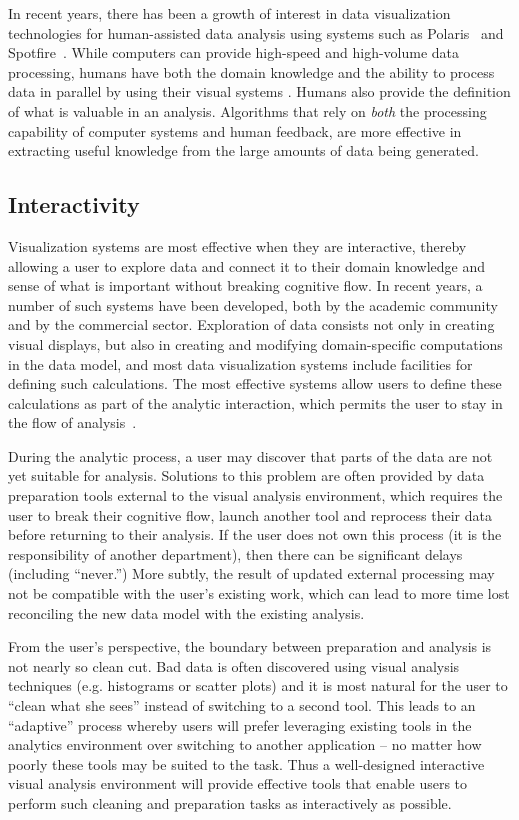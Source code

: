 In recent years, there has been a growth of interest in data visualization technologies for human-assisted data analysis using systems such as Polaris~\cite{Stolte:2008} and Spotfire~\cite{Ahlberg:1996}. While computers can provide high-speed and high-volume data processing, humans have both the domain knowledge and the ability to process data in parallel by using their visual systems \cite{Cleveland.McGill1984,Mackinlay:1986}. Humans also provide the definition of what is valuable in an analysis. Algorithms that rely on \emph{both} the processing capability of computer systems and human feedback, are more effective in extracting useful knowledge from the large amounts of data being generated.

\subsection{Interactivity}
Visualization systems are most effective when they are interactive, thereby allowing a user to explore data and connect it to their domain knowledge and sense of what is important without breaking cognitive flow. In recent years, a number of such systems have been developed, both by the academic community and by the commercial sector. Exploration of data consists not only in creating visual displays, but also in creating and modifying domain-specific computations in the data model, and most data visualization systems include facilities for defining such calculations. The most effective systems allow users to define these calculations as part of the analytic interaction, which permits the user to stay in the flow of analysis~\cite{Morton:2012}.

During the analytic process, a user may discover that parts of the data are not yet suitable for analysis. Solutions to this problem are often provided by data preparation tools external to the visual analysis environment, which requires the user to break their cognitive flow, launch another tool and reprocess their data before returning to their analysis. If the user does not own this process (\eg it is the responsibility of another department), then there can be significant delays (including ``never.'') More subtly, the result of updated external processing may not be compatible with the user's existing work, which can lead to more time lost reconciling the new data model with the existing analysis.

From the user's perspective, the boundary between preparation and analysis is not nearly so clean cut. Bad data is often discovered using visual analysis techniques (e.g. histograms or scatter plots) and it is most natural for the user to ``clean what she sees'' instead of switching to a second tool. This leads to an ``adaptive'' process whereby users will prefer leveraging existing tools in the analytics environment over switching to another application -- no matter how poorly these tools may be suited to the task. Thus a well-designed interactive visual analysis environment will provide effective tools that enable users to perform such cleaning and preparation tasks as interactively as possible.

